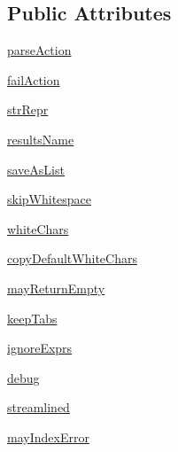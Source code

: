 \subsection*{Public Attributes}
\begin{DoxyCompactItemize}
\item 
\hyperlink{classsetuptools_1_1__vendor_1_1pyparsing_1_1ParserElement_ae04295cc96d86ef30c3ee0805d443b72}{parse\+Action}
\item 
\hyperlink{classsetuptools_1_1__vendor_1_1pyparsing_1_1ParserElement_a9633f2d6837412779901c87470c2a6dc}{fail\+Action}
\item 
\hyperlink{classsetuptools_1_1__vendor_1_1pyparsing_1_1ParserElement_a27e4efffbe48ece304476108057f4998}{str\+Repr}
\item 
\hyperlink{classsetuptools_1_1__vendor_1_1pyparsing_1_1ParserElement_aba96bbd8892533cced040e6edbea7098}{results\+Name}
\item 
\hyperlink{classsetuptools_1_1__vendor_1_1pyparsing_1_1ParserElement_a1f3e48bd60c9e7f257ab217967a6a9c3}{save\+As\+List}
\item 
\hyperlink{classsetuptools_1_1__vendor_1_1pyparsing_1_1ParserElement_ab87bb1a5ee41efe0ede3831ef25146ee}{skip\+Whitespace}
\item 
\hyperlink{classsetuptools_1_1__vendor_1_1pyparsing_1_1ParserElement_a444f5a33b66753fa28044dc05b017c76}{white\+Chars}
\item 
\hyperlink{classsetuptools_1_1__vendor_1_1pyparsing_1_1ParserElement_a9966ea79c08ae622462c1eee03b84a6e}{copy\+Default\+White\+Chars}
\item 
\hyperlink{classsetuptools_1_1__vendor_1_1pyparsing_1_1ParserElement_a24ee787a12e64be1a87f0712f9a8ffe4}{may\+Return\+Empty}
\item 
\hyperlink{classsetuptools_1_1__vendor_1_1pyparsing_1_1ParserElement_a619633cebf313c2e6bf6d8c79cada6e9}{keep\+Tabs}
\item 
\hyperlink{classsetuptools_1_1__vendor_1_1pyparsing_1_1ParserElement_ac296f8bf8ab4e8d8ea42029172ec3590}{ignore\+Exprs}
\item 
\hyperlink{classsetuptools_1_1__vendor_1_1pyparsing_1_1ParserElement_a743e15e963008dfefbd364d03b084ca2}{debug}
\item 
\hyperlink{classsetuptools_1_1__vendor_1_1pyparsing_1_1ParserElement_ab091acd5cf1a2de85fc672f648dad9ff}{streamlined}
\item 
\hyperlink{classsetuptools_1_1__vendor_1_1pyparsing_1_1ParserElement_a3090139f86c00cc08d3ccf0b2801be5c}{may\+Index\+Error}
\item 

\end{DoxyCompactItemize}
